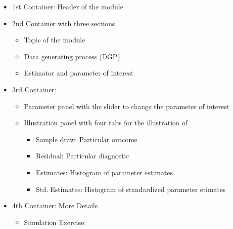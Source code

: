 \documentclass{article}
\begin{document}
\begin{itemize}
	\item 1st Container: Header of the module
	\item 2nd Container with three sections
	\begin{itemize}
		\item Topic of the module
		\item Data generating process (DGP)
		\item Estimator and parameter of interest
	\end{itemize}
	\item 3rd Container:
	\begin{itemize}
		\item Parameter panel with the slider to change the parameter of interest
		\item Illustration panel with four tabs for the illustration of
		\begin{itemize}
			\item Sample draw: Particular outcome
			\item Residual: Particular diagnostic
			\item Estimates: Histogram of parameter estimates
			\item Std. Estimates: Histogram of standardized parameter etimates
		\end{itemize}
	\end{itemize}
	\item 4th Container: More Details
	\begin{itemize}
		\item Simulation Exercise: 
	\end{itemize}
	
\end{itemize}





	
\end{document}
